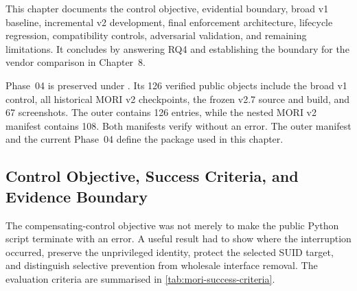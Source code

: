 This chapter documents the control objective, evidential boundary, broad v1
baseline, incremental v2 development, final enforcement architecture,
lifecycle regression, compatibility controls, adversarial validation, and
remaining limitations. It concludes by answering RQ4 and establishing the
boundary for the vendor comparison in Chapter~8.

\begin{evidencebox}
Phase~04 is preserved under . Its 126
verified public objects include the broad v1 control, all historical MORI v2
checkpoints, the frozen v2.7 source and build, and 67 screenshots. The outer
 contains 126 entries, while the nested MORI v2
manifest contains 108. Both manifests verify without an error. The outer
manifest and the current Phase~04  define the package used in
this chapter.
\end{evidencebox}

\subsection{Control Objective, Success Criteria, and Evidence Boundary}

The compensating-control objective was not merely to make the public Python
script terminate with an error. A useful result had to show where the
interruption occurred, preserve the unprivileged identity, protect the selected
SUID target, and distinguish selective prevention from wholesale interface
removal. The evaluation criteria are summarised in
\cref{tab:mori-success-criteria}.

